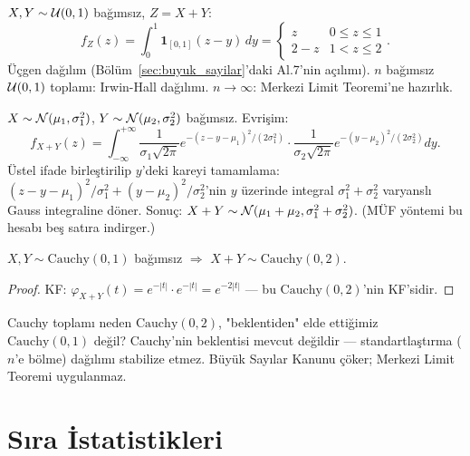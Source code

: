 \begin{ornek}
$X, Y \sim \mathcal{U}(0,1)$ bağımsız, $Z = X + Y$:
\[
  f_Z(z) = \int_0^1 \mathbf{1}_{[0,1]}(z-y)\,dy
  = \begin{cases} z & 0 \leq z \leq 1 \\ 2-z & 1 < z \leq 2 \end{cases}.
\]
Üçgen dağılım (Bölüm~\ref{sec:buyuk_sayilar}'daki Al.7'nin açılımı).
$n$ bağımsız $\mathcal{U}(0,1)$ toplamı: Irwin-Hall dağılımı.
$n \to \infty$: Merkezi Limit Teoremi'ne hazırlık.
\end{ornek}

\begin{ornek}
$X \sim \mathcal{N}(\mu_1, \sigma_1^2)$, $Y \sim \mathcal{N}(\mu_2, \sigma_2^2)$ bağımsız.
Evrişim:
\[
  f_{X+Y}(z) = \int_{-\infty}^{+\infty} \frac{1}{\sigma_1\sqrt{2\pi}}e^{-(z-y-\mu_1)^2/(2\sigma_1^2)}
  \cdot \frac{1}{\sigma_2\sqrt{2\pi}}e^{-(y-\mu_2)^2/(2\sigma_2^2)} dy.
\]
Üstel ifade birleştirilip $y$'deki kareyi tamamlama:
$(z-y-\mu_1)^2/\sigma_1^2 + (y-\mu_2)^2/\sigma_2^2$'nin $y$ üzerinde integral
$\sigma_1^2+\sigma_2^2$ varyanslı Gauss integraline döner.
Sonuç: $X+Y \sim \mathcal{N}(\mu_1+\mu_2, \sigma_1^2+\sigma_2^2)$.
(MÜF yöntemi bu hesabı beş satıra indirger.)
\end{ornek}

\begin{onerme}
$X, Y \sim \mathrm{Cauchy}(0,1)$ bağımsız $\Rightarrow$ $X+Y \sim \mathrm{Cauchy}(0,2)$.
\end{onerme}

\begin{proof}
KF: $\varphi_{X+Y}(t) = e^{-|t|} \cdot e^{-|t|} = e^{-2|t|}$ --- bu $\mathrm{Cauchy}(0,2)$'nin KF'sidir.
\end{proof}

\begin{kritiksorgu}
Cauchy toplamı neden $\mathrm{Cauchy}(0,2)$, "beklentiden" elde ettiğimiz $\mathrm{Cauchy}(0,1)$ değil?
Cauchy'nin beklentisi mevcut değildir --- standartlaştırma ($n$'e bölme) dağılımı stabilize etmez.
Büyük Sayılar Kanunu çöker; Merkezi Limit Teoremi uygulanmaz.
\end{kritiksorgu}

\section{Sıra İstatistikleri}
\label{sec:sira_istatistikleri}

